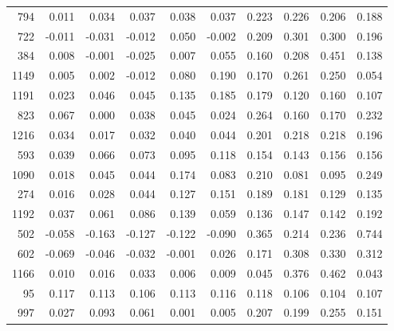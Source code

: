 \begin{longtable}{rrrrrrrrrr}
   794 &  0.011 &  0.034 &  0.037 &  0.038 &  0.037 &  0.223 &  0.226 &  0.206 & 0.188 \\
   722 & -0.011 & -0.031 & -0.012 &  0.050 & -0.002 &  0.209 &  0.301 &  0.300 & 0.196 \\
   384 &  0.008 & -0.001 & -0.025 &  0.007 &  0.055 &  0.160 &  0.208 &  0.451 & 0.138 \\
  1149 &  0.005 &  0.002 & -0.012 &  0.080 &  0.190 &  0.170 &  0.261 &  0.250 & 0.054 \\
  1191 &  0.023 &  0.046 &  0.045 &  0.135 &  0.185 &  0.179 &  0.120 &  0.160 & 0.107 \\
   823 &  0.067 &  0.000 &  0.038 &  0.045 &  0.024 &  0.264 &  0.160 &  0.170 & 0.232 \\
  1216 &  0.034 &  0.017 &  0.032 &  0.040 &  0.044 &  0.201 &  0.218 &  0.218 & 0.196 \\
   593 &  0.039 &  0.066 &  0.073 &  0.095 &  0.118 &  0.154 &  0.143 &  0.156 & 0.156 \\
  1090 &  0.018 &  0.045 &  0.044 &  0.174 &  0.083 &  0.210 &  0.081 &  0.095 & 0.249 \\
   274 &  0.016 &  0.028 &  0.044 &  0.127 &  0.151 &  0.189 &  0.181 &  0.129 & 0.135 \\
  1192 &  0.037 &  0.061 &  0.086 &  0.139 &  0.059 &  0.136 &  0.147 &  0.142 & 0.192 \\
   502 & -0.058 & -0.163 & -0.127 & -0.122 & -0.090 &  0.365 &  0.214 &  0.236 & 0.744 \\
   602 & -0.069 & -0.046 & -0.032 & -0.001 &  0.026 &  0.171 &  0.308 &  0.330 & 0.312 \\
  1166 &  0.010 &  0.016 &  0.033 &  0.006 &  0.009 &  0.045 &  0.376 &  0.462 & 0.043 \\
    95 &  0.117 &  0.113 &  0.106 &  0.113 &  0.116 &  0.118 &  0.106 &  0.104 & 0.107 \\
   997 &  0.027 &  0.093 &  0.061 &  0.001 &  0.005 &  0.207 &  0.199 &  0.255 & 0.151 \\
\end{longtable}
